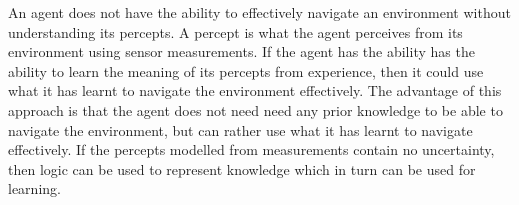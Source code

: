 
An agent does not have the ability to effectively navigate an environment without understanding its percepts. A percept is what the agent perceives from its environment using sensor measurements. If the agent has the ability has the ability to learn the meaning of its percepts from experience, then it could use what it has learnt to navigate the environment effectively. The advantage of this approach is that the agent does not need need any prior knowledge to be able to navigate the environment, but can rather use what it has learnt to navigate effectively. If the percepts modelled from measurements contain no uncertainty, then logic can be used to represent knowledge which in turn can be used for learning.







